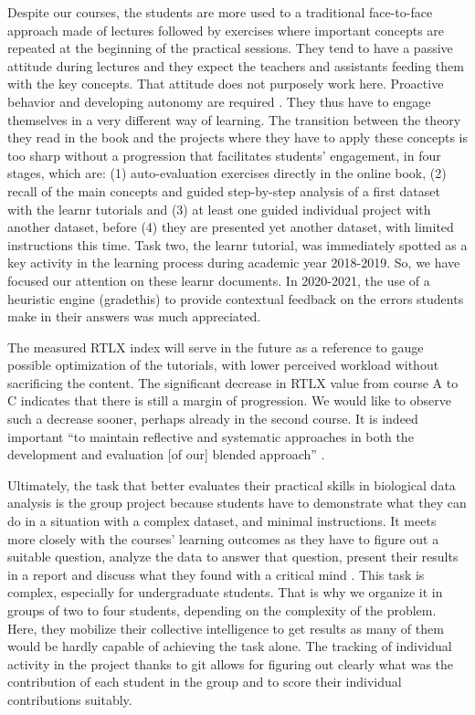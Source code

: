 \documentclass{aims}
\theoremstyle{definition}
\begin{document}
Despite our courses, the students are more used to a traditional
face-to-face approach made of lectures followed by exercises where
important concepts are repeated at the beginning of the practical
sessions. They tend to have a passive attitude during lectures and they
expect the teachers and assistants feeding them with the key concepts.
That attitude does not purposely work here. Proactive behavior and
developing autonomy are required \cite{Freeman2014}. They thus have to
engage themselves in a very different way of learning. The transition
between the theory they read in the book and the projects where they
have to apply these concepts is too sharp without a progression that
facilitates students' engagement, in four stages, which are: (1)
auto-evaluation exercises directly in the online book, (2) recall of the
main concepts and guided step-by-step analysis of a first dataset with
the learnr tutorials and (3) at least one guided individual project with
another dataset, before (4) they are presented yet another dataset, with
limited instructions this time. Task two, the learnr tutorial, was
immediately spotted as a key activity in the learning process during
academic year 2018-2019. So, we have focused our attention on these
learnr documents. In 2020-2021, the use of a heuristic engine
(gradethis) to provide contextual feedback on the errors students make
in their answers was much appreciated.

The measured RTLX index will serve in the future as a reference to gauge
possible optimization of the tutorials, with lower perceived workload
without sacrificing the content. The significant decrease in RTLX value
from course A to C indicates that there is still a margin of
progression. We would like to observe such a decrease sooner, perhaps
already in the second course. It is indeed important ``to maintain
reflective and systematic approaches in both the development and
evaluation {[}of our{]} blended approach'' \cite{Spadafora2018}.

Ultimately, the task that better evaluates their practical skills in
biological data analysis is the group project because students have to
demonstrate what they can do in a situation with a complex dataset, and
minimal instructions. It meets more closely with the courses' learning
outcomes as they have to figure out a suitable question, analyze the
data to answer that question, present their results in a report and
discuss what they found with a critical mind \cite{Auker2020}. This task
is complex, especially for undergraduate students. That is why we
organize it in groups of two to four students, depending on the
complexity of the problem. Here, they mobilize their collective
intelligence to get results as many of them would be hardly capable of
achieving the task alone. The tracking of individual activity in the
project thanks to git allows for figuring out clearly what was the
contribution of each student in the group and to score their individual
contributions suitably.
\end{document}
